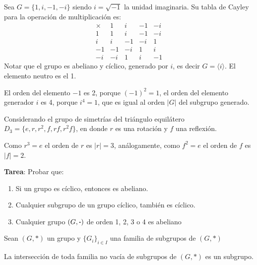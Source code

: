 	\begin{fmd-example}
		Sea $G = \{ 1, i, -1, -i \}$ siendo $i = \sqrt{-1}$ la unidad imaginaria. Su tabla de Cayley para la operación de multiplicación es:
		\[ \begin{array}{r|rrrr}
			\times & 1 & i & -1 & -i\\ \hline
			1 & 1 & i & -1 & -i\\
			i & i & -1 & -i & 1\\
			-1 & -1 & -i & 1 & i\\
			-i & -i & 1 & i & -1 
		\end{array} \]
		Notar que el grupo es abeliano y cíclico, generado por $i$, es decir $G = \langle i \rangle$. El elemento neutro es el 1.
		
		El orden del elemento $-1$ es 2, porque $(-1)^2 = 1$, el orden del elemento generador $i$ es 4, porque $i^4 = 1$, que es igual al orden $|G|$ del subgrupo generado.
	\end{fmd-example}
	
	\begin{fmd-example}
		Considerando el grupo de simetrías del triángulo equilátero $D_3 = \{ e, r, r^2, f, rf, r^2f \}$, en donde $r$ es una rotación y $f$ una reflexión.
		
		Como $r^3 = e$ el orden de $r$ es $|r| = 3$, análogamente, como $f^2 = e$ el orden de $f$ es $|f| = 2$.
	\end{fmd-example}
	
	\textbf{Tarea}: Probar que:
	\begin{enumerate}
		\item Si un grupo es cíclico, entonces es abeliano.
		\item Cualquier subgrupo de un  grupo cíclico, también es cíclico.
		\item Cualquier grupo $(G, \boldsymbol{\cdot})$ de orden 1, 2, 3 o 4 es abeliano
	\end{enumerate}

	Sean $(G, *)$ un grupo y $\{G_i\}_{i \in I}$ una familia de subgrupos de $(G, *)$
	\begin{fmd-theorem}
		La intersección de toda familia no vacía de subgrupos de $(G, *)$ es un subgrupo.
	\end{fmd-theorem}
	
